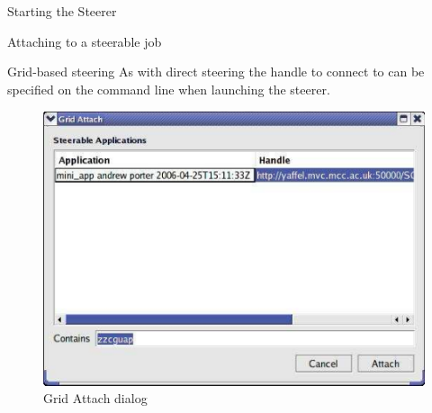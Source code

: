 \documentclass[a4paper,twoside]{article}
\begin{document}
\begin{section}{Starting the Steerer}
\begin{subsection}{Attaching to a steerable job}
\begin{subsubsection}{Grid-based steering}
As with direct steering the handle to connect to can be specified on
the command line when launching the steerer.
\end{subsubsection}

\begin{figure}
\centerline{\includegraphics{grid_attach.png}}
\caption{Grid Attach dialog}
\label{fig:grid_attach}
\end{figure}

\end{subsection}
\end{section}

\end{document}
